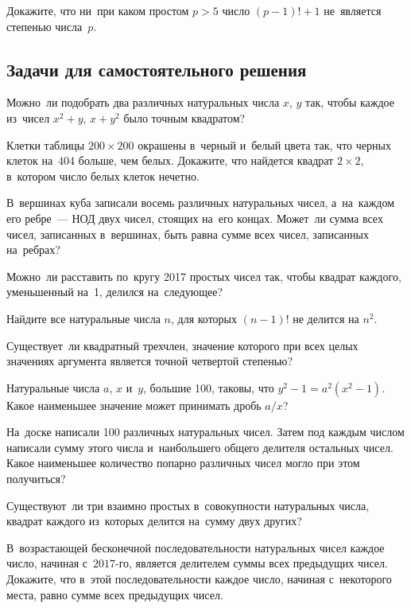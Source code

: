 


Докажите, что ни~при каком простом $p > 5$ число $(p - 1)! + 1$ не~является
степенью числа~$p$.

\subsection*{Задачи для самостоятельного решения}

\begin{problems}

\item
Можно~ли подобрать два различных натуральных числа $x$, $y$ так, чтобы каждое
из~чисел $x^2 + y$, $x + y^2$ было точным квадратом?

\item
Клетки таблицы $200 \times 200$ окрашены в~черный и~белый цвета так, что черных
клеток на~$404$ больше, чем белых.
Докажите, что найдется квадрат $2 \times 2$, в~котором число белых клеток
нечетно.

\item
В~вершинах куба записали восемь различных натуральных чисел, а~на~каждом его
ребре~--- НОД двух чисел, стоящих на~его концах.
Может~ли сумма всех чисел, записанных в~вершинах, быть равна сумме всех чисел,
записанных на~ребрах?

\item
Можно~ли расставить по~кругу 2017 простых чисел так, чтобы квадрат каждого,
уменьшенный на~1, делился на~следующее?

\item
Найдите все натуральные числа $n$, для которых $(n - 1)!$ не делится на $n^2$.

\item
Существует~ли квадратный трехчлен, значение которого при всех целых
значениях аргумента является точной четвертой степенью?

\item
Натуральные числа $a$, $x$ и~$y$, большие 100, таковы, что
$y^2 - 1 = a^2 (x^2 - 1)$.
Какое наименьшее значение может принимать дробь $a / x$?

\item
На~доске написали 100 различных натуральных чисел.
Затем под каждым числом написали сумму этого числа и~наибольшего общего
делителя остальных чисел.
Какое наименьшее количество попарно различных чисел могло при этом получиться?

\item
Существуют~ли три взаимно простых в~совокупности натуральных числа, квадрат
каждого из~которых делится на~сумму двух других?

\item
В~возрастающей бесконечной последовательности натуральных чисел каждое число,
начиная с~$2017$-го, является делителем суммы всех предыдущих чисел.
Докажите, что в~этой последовательности каждое число, начиная с~некоторого
места, равно сумме всех предыдущих чисел.

\end{problems}


